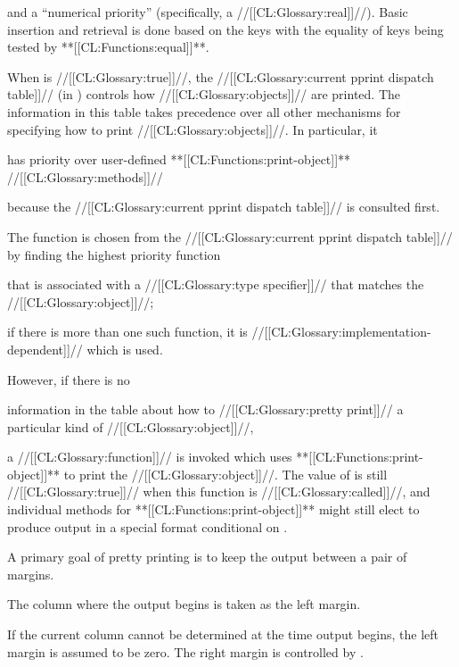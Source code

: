  and a ``numerical priority'' (specifically, a //[[CL:Glossary:real]]//). Basic insertion and retrieval is done based on the keys with the equality of keys being tested by **[[CL:Functions:equal]]**.

When  is //[[CL:Glossary:true]]//,  the //[[CL:Glossary:current pprint dispatch table]]// (in ) controls how //[[CL:Glossary:objects]]// are printed. The information in this table takes precedence over all other mechanisms for specifying how to print //[[CL:Glossary:objects]]//. In particular, it 

has priority over user-defined **[[CL:Functions:print-object]]** //[[CL:Glossary:methods]]//  

because the //[[CL:Glossary:current pprint dispatch table]]// is consulted first.

The function is chosen from the //[[CL:Glossary:current pprint dispatch table]]// by finding the highest priority function 

that is associated with a //[[CL:Glossary:type specifier]]// that matches the //[[CL:Glossary:object]]//;

if there is more than one such function,  it is //[[CL:Glossary:implementation-dependent]]// which is used.

However, if there is no 

information in the table about how to //[[CL:Glossary:pretty print]]// a particular kind of //[[CL:Glossary:object]]//, 

a //[[CL:Glossary:function]]// is invoked which uses **[[CL:Functions:print-object]]** to print the //[[CL:Glossary:object]]//. The value of  is still //[[CL:Glossary:true]]//  when this function is //[[CL:Glossary:called]]//, and individual methods for **[[CL:Functions:print-object]]** might still elect to produce output in a special format conditional on .

\endsubsubsection%


A primary goal of pretty printing is to keep the output between a pair of margins. 

The column where the output begins is taken as the left margin.

If the current column cannot be determined at the time output begins, the left margin is assumed to be zero. The right margin is controlled by .

